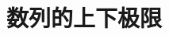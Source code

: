 \documentclass[11pt,a4paper]{ctexart}
\makeatletter
\theoremstyle{thmseries} %
\theoremstyle{exerseries}
\newtheorem{defn}{定义}[section]
\newtheorem{exer}{习题}[section]
\renewenvironment{proof}[1][\proofname]{\par
  \pushQED{\qed}%
  \normalfont \topsep6\p@\@plus6\p@\relax
  \trivlist
  \item[\hskip\labelsep
        \itshape
    #1\@addpunct{}]\ignorespaces
}{%
  \popQED\endtrivlist\@endpefalse
}
\newenvironment{pf}{\begin{proof}[\bfseries\upshape 证\quad]}{\end{proof}}
\newcommand{\bra}[1]{\mathopen{}\left(#1\right)}
\newcommand{\sbra}[1]{\mathopen{}\left[#1\right]}
\newcommand{\cbra}[1]{\mathopen{}\left\{#1\right\}}
\renewcommand{\epsilon}{\varepsilon}
\newcommand{\R}{\mathbb{R}}
\newcommand{\N}{\mathbb{N}}
\def \nti {\mathnormal{n}\to\infty}
\DeclareMathOperator{\ulim}{\underset{\nti}{\overline{\lim}}}
\makeatother
\begin{document}




\section{数列的上下极限}
\end{document}
